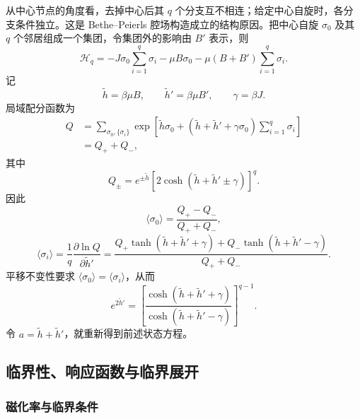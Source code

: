 从中心节点的角度看，去掉中心后其 \(q\) 个分支互不相连；给定中心自旋时，各分支条件独立。这是 Bethe--Peierls 腔场构造成立的结构原因。把中心自旋 \(\sigma_0\) 及其 \(q\) 个邻居组成一个集团，令集团外的影响由 \(B'\) 表示，则
\begin{equation*}
	\mathcal H_q
	=-J\sigma_0\sum_{i=1}^q\sigma_i
	-\mu B\sigma_0
	-\mu(B+B')\sum_{i=1}^q\sigma_i .
\end{equation*}
记
\begin{equation*}
	\widetilde h=\beta\mu B,\qquad
	\widetilde h'=\beta\mu B',\qquad
	\gamma=\beta J .
\end{equation*}
局域配分函数为
\begin{align*}
	Q&=\sum_{\sigma_0,\{\sigma_i\}}
	\exp\left[
	\widetilde h\sigma_0+
	\left(\widetilde h+\widetilde h'
	+\gamma\sigma_0\right)\sum_{i=1}^q\sigma_i
	\right]\\
	&=Q_++Q_-,
\end{align*}
其中
\begin{equation*}
	Q_\pm=e^{\pm\widetilde h}
	\left[2\cosh\left(\widetilde h+\widetilde h'\pm\gamma\right)\right]^q.
\end{equation*}
因此
\begin{equation*}
	\langle\sigma_0\rangle
	=\frac{Q_+-Q_-}{Q_++Q_-},
\end{equation*}
\begin{equation*}
	\langle\sigma_i\rangle
	=\frac1q\frac{\partial\ln Q}{\partial\widetilde h'}
	=\frac{
	Q_+\tanh(\widetilde h+\widetilde h'+\gamma)
	+Q_-\tanh(\widetilde h+\widetilde h'-\gamma)}
	{Q_++Q_-}.
\end{equation*}
平移不变性要求 \(\langle\sigma_0\rangle=\langle\sigma_i\rangle\)，从而
\begin{equation*}
	e^{2\widetilde h'}
	=\left[
	\frac{\cosh(\widetilde h+\widetilde h'+\gamma)}
	{\cosh(\widetilde h+\widetilde h'-\gamma)}
	\right]^{q-1}.
\end{equation*}
令 \(a=\widetilde h+\widetilde h'\)，就重新得到前述状态方程。

\subsection{临界性、响应函数与临界展开}

\subsubsection{磁化率与临界条件}

